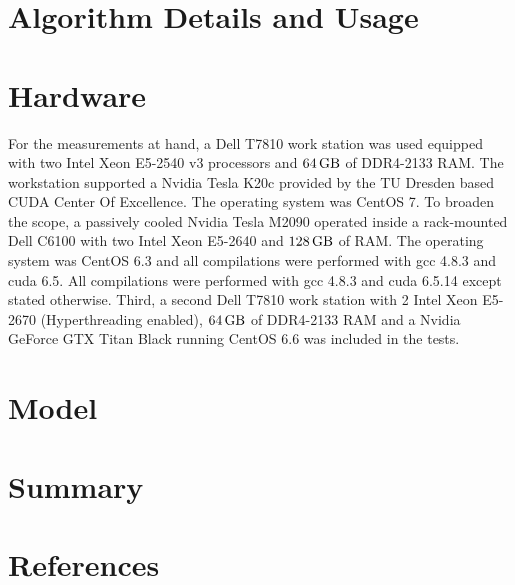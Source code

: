 \documentclass [a4paper,12pt]{article}
\begin{document}
\section{Algorithm Details and Usage}
\label{sec:alg}


\clearpage
\section{Hardware}
\label{sec:hw}

For the measurements at hand, a Dell T7810 work station was used equipped with two Intel Xeon E5-2540 v3 processors and $\unit[64]{GB}$ of DDR4-2133 RAM. The workstation supported a Nvidia Tesla K20c provided by the TU Dresden based CUDA Center Of Excellence. The operating system was CentOS 7. To broaden the scope, a passively cooled Nvidia Tesla M2090 operated inside a rack-mounted Dell C6100 with two Intel Xeon E5-2640 and $\unit[128]{GB}$ of RAM. The operating system was CentOS 6.3 and all compilations were performed with gcc 4.8.3 and cuda 6.5. All compilations were performed with gcc 4.8.3 and cuda 6.5.14 except stated otherwise. Third, a second Dell T7810 work station with 2 Intel Xeon E5-2670 (Hyperthreading enabled), $\unit[64]{GB}$ of DDR4-2133 RAM and a Nvidia GeForce GTX Titan Black running CentOS 6.6 was included in the tests.

\section{Model}
\label{sec:models}



\clearpage

\section{Summary}
\label{sec:summ}


\section{References}


\end{document}
